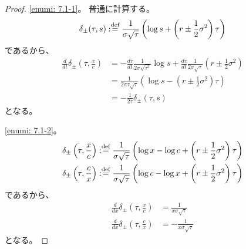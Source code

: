 \documentclass[uplatex]{jsarticle}
\theoremstyle{definition}
\def\dfn{:\overset{\mbox{{\scriptsize def}}}{=}}
\begin{document}
\begin{proof}
  \ref{enumi: 7.1-1}。
  普通に計算する。
  \[
  \delta_{\pm}(\tau, s) \dfn
  \frac{1}{\sigma\sqrt{\tau}}\left( \log s + \left(
  r \pm \frac{1}{2}\sigma^2\right)\tau \right)
  \]
  であるから、
  \begin{align*}
    \frac{d}{dt}\delta_{\pm}\left(\tau, \frac{x}{c}\right)
    &= - \frac{d\tau}{dt}\frac{1}{2\sigma\sqrt{\tau^3}}\log s
    + \frac{d\tau}{dt}\frac{1}{2\sigma\sqrt{\tau}}
    \left( r \pm \frac{1}{2}\sigma^2\right) \\
    &= \frac{1}{2\sigma\tau\sqrt{\tau}} \left( \log s
    - \left( r \pm \frac{1}{2}\sigma^2\right) \tau \right) \\
    &= -\frac{1}{2\tau}\delta_{\pm}(\tau,s)
  \end{align*}
  となる。

  \ref{enumi: 7.1-2}。
  \begin{align*}
    &\delta_{\pm}\left( \tau, \frac{x}{c}\right) \dfn
    \frac{1}{\sigma\sqrt{\tau}}\left( \log x - \log c + \left(
    r \pm \frac{1}{2}\sigma^2\right)\tau \right) \\
    &\delta_{\pm}\left( \tau, \frac{c}{x}\right) \dfn
    \frac{1}{\sigma\sqrt{\tau}}\left( \log c - \log x + \left(
    r \pm \frac{1}{2}\sigma^2\right)\tau \right)
  \end{align*}
  であるから、
  \begin{align*}
    \frac{d}{dx}\delta_{\pm}\left( \tau, \frac{x}{c}\right)
    &= \frac{1}{x\sigma\sqrt{\tau}} \\
    \frac{d}{dx}\delta_{\pm}\left( \tau, \frac{c}{x}\right)
    &= - \frac{1}{x\sigma\sqrt{\tau}}
  \end{align*}
  となる。


\end{proof}
\end{document}
